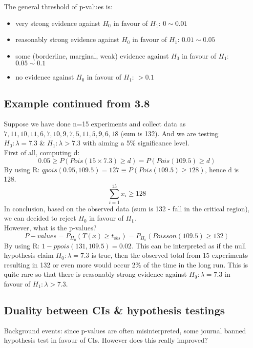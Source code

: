 \documentclass[12pt ]{article}
\begin{document}
The general threshold of p-values is:
\begin{itemize}
\item very strong evidence against $H_{0}$ in favour of $H_{1}$: $0 \sim 0.01$
\item reasonably strong evidence against $H_{0}$ in favour of $H_{1}$: $0.01 \sim 0.05$
\item some (borderline, marginal, weak) evidence against $H_{0}$ in favour of $H_{1}$: $0.05 \sim 0.1$
\item no evidence against $H_{0}$ in favour of $H_{1}$: $ > 0.1$
\end{itemize}
\subsection{Example continued from 3.8}
Suppose we have done n=15 experiments and collect data as $7, 11, 10, 11, 6, 7, 10, 9, 7 ,5, 11, 5, 9, 6, 18$ (sum is 132). And we are testing $H_{0}: \lambda = 7.3$ \& $H_{1}: \lambda > 7.3$ with aiming a 5\% significance level. \\

First of all, computing d:
\begin{equation*}
0.05 \geq P(Pois(15\times 7.3) \geq d) = P(Pois(109.5) \geq d)
\end{equation*}
By using R: $qpois(0.95, 109.5) = 127 \equiv P(Pois(109.5) \geq 128)$, hence d is 128. 
\begin{equation*}
\sum_{i=1}^{15} x_{i}\geq 128
\end{equation*}
In conclusion, based on the observed data (sum is 132 - fall in the critical region), we can decided to reject $H_{0}$ in favour of $H_{1}$.\\
However, what is the p-values?
\begin{equation*}
P-values = P_{H_{0}}(T(x) \geq t_{obs}) = P_{H_{0}}(Poisson(109.5) \geq 132)
\end{equation*}
By using R: $1-ppois(131, 109.5) = 0.02$. This can be interpreted as if the null hypothesis claim $H_{0}: \lambda = 7.3$ is true, then the observed total from 15 experiments resulting in 132 or even more would occur 2\% of the time in the long run. This is quite rare so that there is reasonably strong evidence against $H_{0}: \lambda = 7.3$ in favour of $H_{1}: \lambda > 7.3$.
\subsection{Duality between CIs \& hypothesis testings}
Background events: since p-values are often misinterpreted, some journal banned hypothesis test in favour of CIs. However does this really improved? \\
\end{document}
